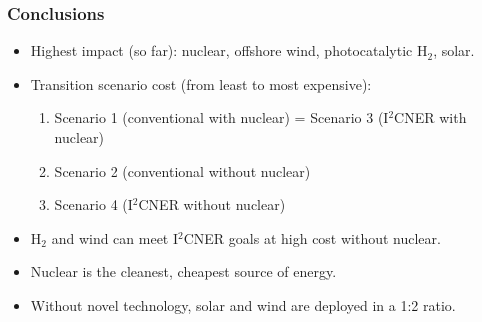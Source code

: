 \begin{frame}
  \frametitle{Conclusions}
        \begin{itemize}
        
        \item Highest impact (so far): nuclear, offshore wind, photocatalytic H$_2$, solar.
        
        \item Transition scenario cost (from least to most expensive):
        
        \begin{enumerate} 
        
        \item Scenario 1 (conventional with nuclear) = Scenario 3 (I$^2$CNER with nuclear)
        
        \item Scenario 2 (conventional without nuclear)
        
        \item Scenario 4 (I$^2$CNER without nuclear)
        
        \end{enumerate}         
         
        
        \item H$_2$ and wind can meet I$^2$CNER goals at high cost without nuclear.

        \item Nuclear is the cleanest, cheapest source of energy.
        
        \item Without novel technology, solar and wind are deployed in a 1:2 ratio.
                
        \end{itemize}
\end{frame}
